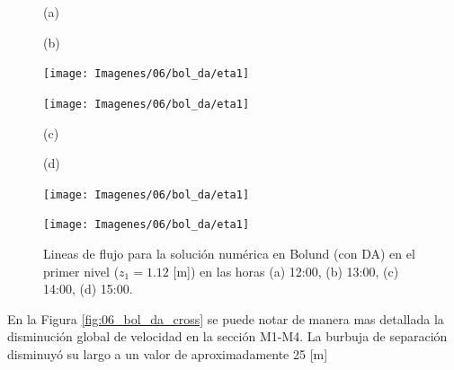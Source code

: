 \begin{figure}[H]
	\begin{minipage}{0.5\linewidth}
		\centering
		\hspace{1cm}(a)
	\end{minipage}%
	\begin{minipage}{0.5\linewidth}
		\centering
		\hspace{-1cm}(b)
	\end{minipage}%
	
	\begin{minipage}{0.5\linewidth}
		\centering
		\texttt{[image: Imagenes/06/bol\_da/eta1]}%
	\end{minipage}%
	\begin{minipage}{0.5\linewidth}
		\centering
		\texttt{[image: Imagenes/06/bol\_da/eta1]}%
	\end{minipage}%
	\vspace{1mm}
	
	\begin{minipage}{0.5\linewidth}
		\centering
		\hspace{1cm}(c)
	\end{minipage}%
	\begin{minipage}{0.5\linewidth}
		\centering
		\hspace{-1cm}(d)
	\end{minipage}%
	
	\begin{minipage}{0.5\linewidth}
		\centering
		\texttt{[image: Imagenes/06/bol\_da/eta1]}%
	\end{minipage}%
	\begin{minipage}{0.5\linewidth}
		\centering
		\texttt{[image: Imagenes/06/bol\_da/eta1]}%
	\end{minipage}%
	\caption{Lineas de flujo para la solución numérica en Bolund (con DA) en el primer nivel ($z_1 = 1.12$ [m]) en las horas (a) 12:00, (b) 13:00, (c) 14:00, (d) 15:00.}
	\label{fig:06_bol_da_st}
\end{figure}
En la Figura \ref{fig:06_bol_da_cross} se puede notar de manera mas detallada la disminución global de velocidad en la sección M1-M4. La burbuja de separación disminuyó su largo a un valor de aproximadamente 25 [m]
